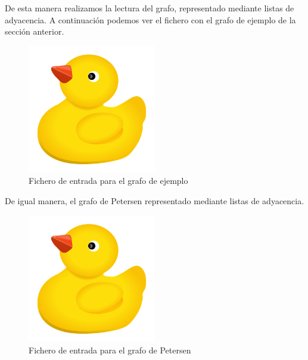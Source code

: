 \documentclass{article}
\begin{document}
        De esta manera realizamos la lectura del grafo, representado mediante listas de adyacencia.
        A continuación podemos ver el fichero con el grafo de ejemplo de la sección anterior.
        \begin{figure}[H]
            \centering
            \includegraphics[width=0.5\textwidth]{pictures/patito.png}
            \caption{Fichero de entrada para el grafo de ejemplo}
        \end{figure}

        De igual manera, el grafo de Petersen representado mediante listas de adyacencia. 
        \begin{figure}[H]
            \centering
            \includegraphics[width=0.5\textwidth]{pictures/patito.png}
            \caption{Fichero de entrada para el grafo de Petersen}
        \end{figure}
    
\end{document}
